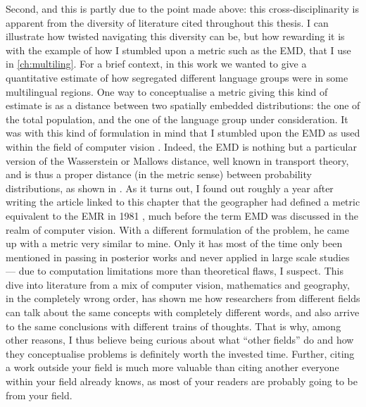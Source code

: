 \documentclass[../thesis.tex]{subfiles}
\begin{document}
Second, and this is partly due to the point made above: this cross-disciplinarity is
apparent from the diversity of literature cited throughout this thesis. I can illustrate
how twisted navigating this diversity can be, but how rewarding it is with the example
of how I stumbled upon a metric such as the \ac{EMD}, that I use in \cref{ch:multiling}.
For a brief context, in this work we wanted to give a quantitative estimate of how
segregated different language groups were in some multilingual regions. 
One way to conceptualise a metric giving this kind of estimate is as a distance between
two spatially embedded distributions: the one of the total population, and the one of
the language group under consideration. 
It was with this kind of formulation in mind that I stumbled upon the \ac{EMD} as used
within the field of computer vision \cite{RubnerMetricDistributions1998}. Indeed, the
\ac{EMD} is nothing but a particular version of the Wasserstein or Mallows distance,
well known in transport theory, and is thus a proper distance (in the metric sense)
between probability distributions, as shown in \cite{LevinaEarthMover2001}. As it turns
out, I found out roughly a year after writing the article linked to this chapter that
the geographer  had defined a
metric equivalent to the \ac{EMR} in 1981 \cite{JakubsDistancebasedSegregation1981},
much before the term \ac{EMD} was discussed in the realm of computer vision. With a
different formulation of the problem, he came up with a metric very similar to mine.
Only it has most of the time only been mentioned in passing in posterior works and never
applied in large scale studies --- due to computation limitations more than theoretical
flaws, I suspect. This dive into literature from a mix of computer vision, mathematics
and geography, in the completely wrong order, has shown me how researchers from
different fields can talk about the same concepts with completely different words, and
also arrive to the same conclusions with different trains of thoughts.
That is why, among other reasons, I thus believe being curious about what ``other
fields'' do and how they conceptualise problems is definitely worth the invested time.
Further, citing a work outside your field is much more valuable than citing another
everyone within your field already knows, as most of your readers are probably going to
be from your field.
\end{document}
